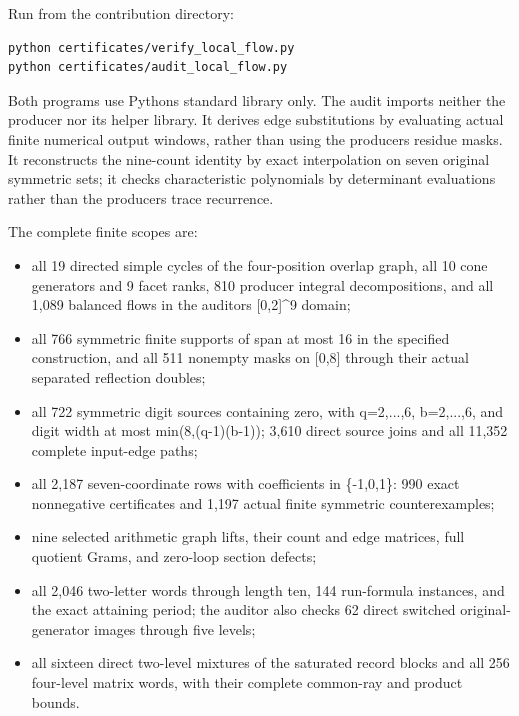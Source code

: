Run from the contribution directory:

\begin{Verbatim}[breaklines=true,breakanywhere=true,fontsize=\footnotesize]
python certificates/verify_local_flow.py
python certificates/audit_local_flow.py
\end{Verbatim}

Both programs use Python\textquotesingle s standard library only. The audit imports neither the producer nor its helper library. It derives edge substitutions by evaluating actual finite numerical output windows, rather than using the producer\textquotesingle s residue masks. It reconstructs the nine-count identity by exact interpolation on seven original symmetric sets; it checks characteristic polynomials by determinant evaluations rather than the producer\textquotesingle s trace recurrence.

The complete finite scopes are:

\begin{itemize}
\tightlist
\item
  all 19 directed simple cycles of the four-position overlap graph, all 10 cone generators and 9 facet ranks, 810 producer integral decompositions, and all 1,089 balanced flows in the auditor\textquotesingle s {[}0,2{]}\^{}9 domain;
\item
  all 766 symmetric finite supports of span at most 16 in the specified construction, and all 511 nonempty masks on {[}0,8{]} through their actual separated reflection doubles;
\item
  all 722 symmetric digit sources containing zero, with q=2,...,6, b=2,...,6, and digit width at most min(8,(q-1)(b-1)); 3,610 direct source joins and all 11,352 complete input-edge paths;
\item
  all 2,187 seven-coordinate rows with coefficients in \{-1,0,1\}: 990 exact nonnegative certificates and 1,197 actual finite symmetric counterexamples;
\item
  nine selected arithmetic graph lifts, their count and edge matrices, full quotient Grams, and zero-loop section defects;
\item
  all 2,046 two-letter words through length ten, 144 run-formula instances, and the exact attaining period; the auditor also checks 62 direct switched original-generator images through five levels;
\item
  all sixteen direct two-level mixtures of the saturated record blocks and all 256 four-level matrix words, with their complete common-ray and product bounds.
\end{itemize}

